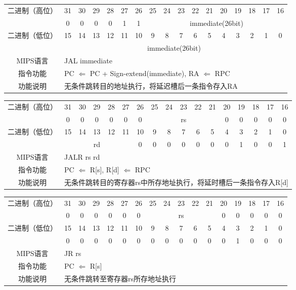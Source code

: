 \begin{table}
\begin{tabular}{|c|c|c|c|c|c|c|c|c|c|c|c|c|c|c|c|c|}
\hline
\multirow{2}{*}{二进制（高位）} &
31&30&29&28&27&26&25&24&23&22&21&20&19&18&17&16\\
\cline{2-17}
&
0&0&0&0&1&
1&
\multicolumn{10}{c|}{immediate(26bit)}\\
\hline
\multirow{2}{*}{二进制（低位）} &
15&14&13&12&11&10&9&8&7&6&5&4&3&2&1&0\\
\cline{2-17}
&
\multicolumn{16}{c|}{immediate(26bit)}\\
\hline
MIPS语言&
\multicolumn{16}{l|}{JAL immediate}\\
\hline
指令功能&
\multicolumn{16}{l|}{PC $\Leftarrow$ PC + Sign-extend(immediate), RA $\Leftarrow$ RPC}\\
\hline
功能说明&
\multicolumn{16}{l|}{无条件跳转目的地址执行，将延迟槽后一条指令存入RA}\\
\hline
\end{tabular}
\end{table}

\begin{table}
\begin{tabular}{|c|c|c|c|c|c|c|c|c|c|c|c|c|c|c|c|c|}
\hline
\multirow{2}{*}{二进制（高位）} &
31&30&29&28&27&26&25&24&23&22&21&20&19&18&17&16\\
\cline{2-17}
&
0&0&0&0&0&
0&
\multicolumn{5}{c|}{rs}&
0&0&0&0&0\\
\hline
\multirow{2}{*}{二进制（低位）} &
15&14&13&12&11&10&9&8&7&6&5&4&3&2&1&0\\
\cline{2-17}
&
\multicolumn{5}{c|}{rd}&
0&0&0&0&0&
0&0&1&0&0&
1\\
\hline
MIPS语言&
\multicolumn{16}{l|}{JALR rs rd}\\
\hline
指令功能&
\multicolumn{16}{l|}{PC $\Leftarrow$ R[s], R[d] $\Leftarrow$ RPC}\\
\hline
功能说明&
\multicolumn{16}{l|}{无条件跳转目的寄存器rs中所存地址执行，将延时槽后一条指令存入R[d]}\\
\hline
\end{tabular}
\end{table}

\begin{table}
\begin{tabular}{|c|c|c|c|c|c|c|c|c|c|c|c|c|c|c|c|c|}
\hline
\multirow{2}{*}{二进制（高位）} &
31&30&29&28&27&26&25&24&23&22&21&20&19&18&17&16\\
\cline{2-17}
&
0&0&0&0&0&
0&
\multicolumn{5}{c|}{rs}&
0&0&0&0&0\\
\hline
\multirow{2}{*}{二进制（低位）} &
15&14&13&12&11&10&9&8&7&6&5&4&3&2&1&0\\
\cline{2-17}
&
0&0&0&0&0&
0&0&0&0&0&
0&0&1&0&0&
0\\
\hline
MIPS语言&
\multicolumn{16}{l|}{JR rs}\\
\hline
指令功能&
\multicolumn{16}{l|}{PC $\Leftarrow$ R[s]}\\
\hline
功能说明&
\multicolumn{16}{l|}{无条件跳转至寄存器rs所存地址执行}\\
\hline
\end{tabular}
\end{table}

